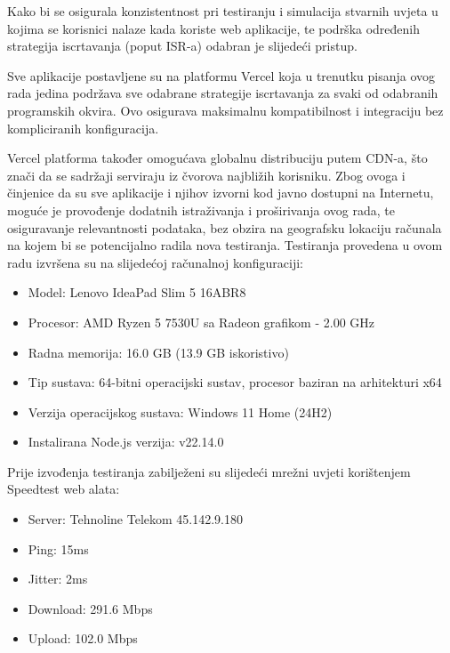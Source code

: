 Kako bi se osigurala konzistentnost pri testiranju i simulacija stvarnih uvjeta u kojima se korisnici nalaze kada koriste web aplikacije, te podrška određenih strategija iscrtavanja (poput ISR-a) odabran je slijedeći pristup.

\bigskip

Sve aplikacije postavljene su na platformu Vercel koja u trenutku pisanja ovog rada jedina podržava sve odabrane strategije iscrtavanja za svaki od odabranih programskih okvira. Ovo osigurava maksimalnu kompatibilnost i integraciju bez kompliciranih konfiguracija.\cite{vercelframeworks}

\bigskip

Vercel platforma također omogućava globalnu distribuciju putem CDN-a, što znači da se sadržaji serviraju iz čvorova najbližih korisniku. Zbog ovoga i činjenice da su sve aplikacije i njihov izvorni kod javno dostupni na Internetu, moguće je provođenje dodatnih istraživanja i proširivanja ovog rada, te osiguravanje relevantnosti podataka, bez obzira na geografsku lokaciju računala na kojem bi se potencijalno radila nova testiranja.
Testiranja provedena u ovom radu izvršena su na slijedećoj računalnoj konfiguraciji:

\bigskip

\begin{itemize}
    \item Model: Lenovo IdeaPad Slim 5 16ABR8
    \item Procesor: AMD Ryzen 5 7530U sa Radeon grafikom - 2.00 GHz
    \item Radna memorija: 16.0 GB (13.9 GB iskoristivo)
    \item Tip sustava: 64-bitni operacijski sustav, procesor baziran na arhitekturi x64
    \item Verzija operacijskog sustava: Windows 11 Home (24H2)
    \item Instalirana Node.js verzija: v22.14.0
\end{itemize}

Prije izvođenja testiranja zabilježeni su slijedeći mrežni uvjeti korištenjem Speedtest web alata:

\begin{itemize}
    \item Server: Tehnoline Telekom 45.142.9.180
    \item Ping: 15ms
    \item Jitter: 2ms
    \item Download: 291.6 Mbps
    \item Upload: 102.0 Mbps
\end{itemize}
